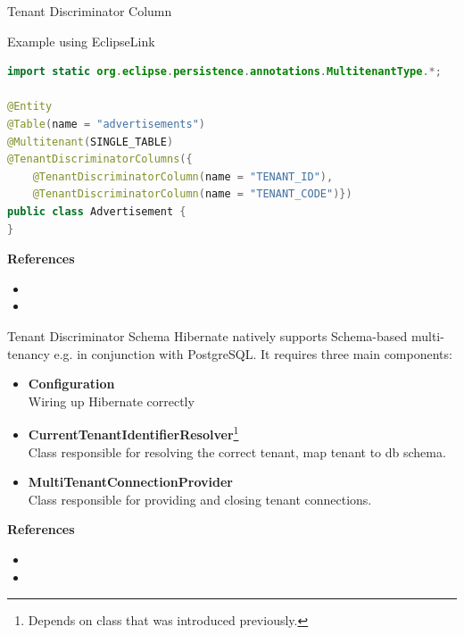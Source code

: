 \begin{frame}[t,fragile]{Tenant Discriminator Column}

\begin{block}{Example using EclipseLink}
\begin{lstlisting}[language=Java,belowskip=0mm,aboveskip=0mm]
import static org.eclipse.persistence.annotations.MultitenantType.*;

@Entity
@Table(name = "advertisements")
@Multitenant(SINGLE_TABLE) 
@TenantDiscriminatorColumns({ 
    @TenantDiscriminatorColumn(name = "TENANT_ID"),
    @TenantDiscriminatorColumn(name = "TENANT_CODE")})
public class Advertisement {
}
\end{lstlisting}
\end{block}
\vfill
\textbf{References}
\begin{itemize}
\item {}
\item {}
\end{itemize}
\end{frame}


\begin{frame}[t,fragile]{Tenant Discriminator Schema}
Hibernate natively supports Schema-based multi-tenancy e.g. in conjunction with PostgreSQL. It requires three main components:
\begin{itemize}
\item \textbf{Configuration}\\Wiring up Hibernate correctly
\item \textbf{CurrentTenantIdentifierResolver}\footnote{Depends on  class that was introduced previously.}\\Class responsible for resolving the correct tenant, map tenant to db schema. 
\item \textbf{MultiTenantConnectionProvider}\\Class responsible for providing and closing tenant connections.
\end{itemize}
\vfill
\textbf{References}
\begin{itemize}
\item {}
\item {}
\end{itemize}
\end{frame}


